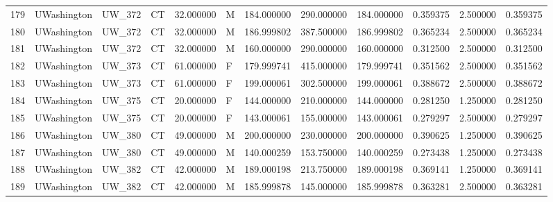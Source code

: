 \begin{tabular}{llllrlrrrrrr}
179    &     UWashington &       UW\_372 &                 CT &  32.000000 &        M &       184.000000 &    290.000000 &  184.000000 &               0.359375 &            2.500000 &          0.359375 \\
180    &     UWashington &       UW\_372 &                 CT &  32.000000 &        M &       186.999802 &    387.500000 &  186.999802 &               0.365234 &            2.500000 &          0.365234 \\
181    &     UWashington &       UW\_372 &                 CT &  32.000000 &        M &       160.000000 &    290.000000 &  160.000000 &               0.312500 &            2.500000 &          0.312500 \\
182    &     UWashington &       UW\_373 &                 CT &  61.000000 &        F &       179.999741 &    415.000000 &  179.999741 &               0.351562 &            2.500000 &          0.351562 \\
183    &     UWashington &       UW\_373 &                 CT &  61.000000 &        F &       199.000061 &    302.500000 &  199.000061 &               0.388672 &            2.500000 &          0.388672 \\
184    &     UWashington &       UW\_375 &                 CT &  20.000000 &        F &       144.000000 &    210.000000 &  144.000000 &               0.281250 &            1.250000 &          0.281250 \\
185    &     UWashington &       UW\_375 &                 CT &  20.000000 &        F &       143.000061 &    155.000000 &  143.000061 &               0.279297 &            2.500000 &          0.279297 \\
186    &     UWashington &       UW\_380 &                 CT &  49.000000 &        M &       200.000000 &    230.000000 &  200.000000 &               0.390625 &            1.250000 &          0.390625 \\
187    &     UWashington &       UW\_380 &                 CT &  49.000000 &        M &       140.000259 &    153.750000 &  140.000259 &               0.273438 &            1.250000 &          0.273438 \\
188    &     UWashington &       UW\_382 &                 CT &  42.000000 &        M &       189.000198 &    213.750000 &  189.000198 &               0.369141 &            1.250000 &          0.369141 \\
189    &     UWashington &       UW\_382 &                 CT &  42.000000 &        M &       185.999878 &    145.000000 &  185.999878 &               0.363281 &            2.500000 &          0.363281 \\

\end{tabular}
